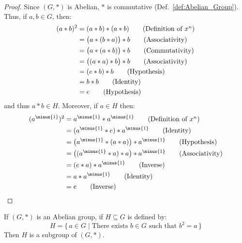         \begin{proof}
            Since $(G,*)$ is Abelian, $*$ is commutative
            (Def.~\ref{def:Abelian_Group}). Thus, if $a,b\in{G}$, then:
            \begin{align}
                (a*b)^{2}&=(a*b)*(a*b)
                \tag{Definition of $x^{n}$}\\
                &=\big(a*(b*a)\big)*b
                \tag{Associativity}\\
                &=\big(a*(a*b)\big)*b
                \tag{Commutativity}\\
                &=\big((a*a)*b\big)*b
                \tag{Associativity}\\
                &=(e*b)*b
                \tag{Hypothesis}\\
                &=b*b
                \tag{Identity}\\
                &=e
                \tag{Hypothesis}
            \end{align}
            and thus $a*b\in{H}$. Moreover, if $a\in{H}$ then:
            \begin{align}
                (a^{\minus{1}})^{2}
                &=a^{\minus{1}}*a^{\minus{1}}
                \tag{Definition of $x^{n}$}\\
                &=(a^{\minus{1}}*e)*a^{\minus{1}}
                \tag{Identity}\\
                &=\big(a^{\minus{1}}*(a*a)\big)*a^{\minus{1}}
                \tag{Hypothesis}\\
                &=\big((a^{\minus{1}}*a)*a\big)*a^{\minus{1}}
                \tag{Associativity}\\
                &=(e*a)*a^{\minus{1}}
                \tag{Inverse}\\
                &=a*a^{\minus{1}}
                \tag{Identity}\\
                &=e
                \tag{Inverse}
            \end{align}
        \end{proof}
        \begin{theorem}
            If $(G,*)$ is an Abelian group, if $H\subseteq{G}$ is defined by:
            \begin{equation}
                H=\{\,a\in{G}\;|\;\textrm{There exists }b\in{G}
                    \textrm{ such that }b^{2}=a\,\}
            \end{equation}
            Then $H$ is a subgroup of $(G,*)$.
        \end{theorem}
